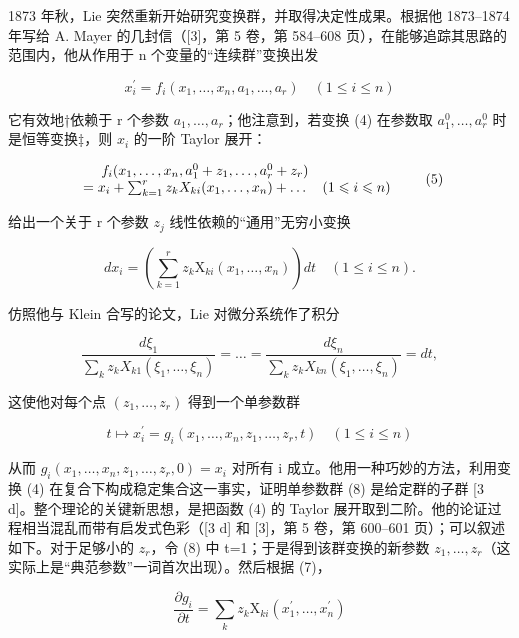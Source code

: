 1873 年秋，Lie 突然重新开始研究变换群，并取得决定性成果。根据他 1873--1874 年写给 A. Mayer 的几封信（{[}3{]}，第 5 卷，第 584--608 页），在能够追踪其思路的范围内，他从作用于 n 个变量的“连续群”变换出发

\[
x _ {i} ^ {\prime} = f _ {i} (x _ {1}, \dots , x _ {n}, a _ {1}, \dots , a _ {r}) \quad (1 \leqslant i \leqslant n)\tag{4}
\]

它有效地†依赖于 r 个参数 \(a_{1},\ldots,a_{r}\)；他注意到，若变换 (4) 在参数取 \(a_{1}^{0},\ldots,a_{r}^{0}\) 时是恒等变换‡，则 \(x_{i}\) 的一阶 Taylor 展开：

\[
\begin{array}{r l} f _ {i} (x _ {1}, \dots , x _ {n}, a _ {1} ^ {0} + z _ {1}, \dots , a _ {r} ^ {0} + z _ {r}) & \\ = x _ {i} + \sum_ {k = 1} ^ {r} z _ {k} X _ {k i} (x _ {1}, \dots , x _ {n}) + \dots & (1 \leqslant i \leqslant n) \end{array} \tag {5}
\]

给出一个关于 r 个参数 \(z_{j}\) 线性依赖的“通用”无穷小变换

\[
d x _ {i} = \left(\sum_ {k = 1} ^ {r} z _ {k} \mathrm{X} _ {k i} (x _ {1}, \dots , x _ {n})\right) d t \quad (1 \leqslant i \leqslant n).\tag{6}
\]

仿照他与 Klein 合写的论文，Lie 对微分系统作了积分

\[
\frac {d \xi_ {1}}{\sum_ {k} z _ {k} X _ {k 1} (\xi_ {1} , \dots , \xi_ {n})} = \dots = \frac {d \xi_ {n}}{\sum_ {k} z _ {k} X _ {k n} (\xi_ {1} , \dots , \xi_ {n})} = d t,\tag{7}
\]

这使他对每个点 \((z_{1},\ldots,z_{r})\) 得到一个单参数群

\[
t \mapsto x _ {i} ^ {\prime} = g _ {i} (x _ {1}, \dots , x _ {n}, z _ {1}, \dots , z _ {r}, t) \quad (1 \leqslant i \leqslant n)\tag{8}
\]

从而 \(g_{i}(x_{1},\ldots,x_{n},z_{1},\ldots,z_{r},0)=x_{i}\) 对所有 i 成立。他用一种巧妙的方法，利用变换 (4) 在复合下构成稳定集合这一事实，证明单参数群 (8) 是给定群的子群 {[}3 d{]}。整个理论的关键新思想，是把函数 (4) 的 Taylor 展开取到二阶。他的论证过程相当混乱而带有启发式色彩（{[}3 d{]} 和 {[}3{]}，第 5 卷，第 600--601 页）；可以叙述如下。对于足够小的 \(z_{r}\)，令 (8) 中 t=1；于是得到该群变换的新参数 \(z_{1},\ldots,z_{r}\)（这实际上是“典范参数”一词首次出现）。然后根据 (7)，

\[
\frac {\partial g _ {i}}{\partial t} = \sum_ {k} z _ {k} \mathrm{X} _ {k i} (x _ {1} ^ {\prime}, \dots , x _ {n} ^ {\prime})
\]

